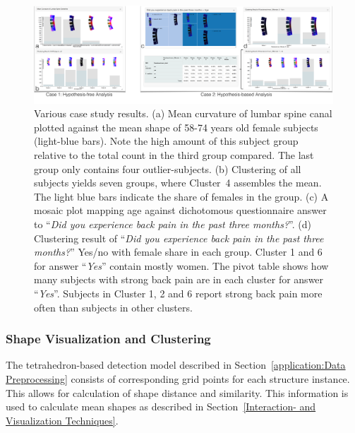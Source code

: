 \documentclass[journal]{style/vgtc} 			          %
\begin{document}
\begin{figure}[htb]
 \centering
 \includegraphics[width=1\textwidth, resolution=300]{figures/evaluation}
 \caption{Various case study results.
 (a) Mean curvature of lumbar spine canal plotted against the mean shape of 58-74 years old female subjects (light-blue bars).
 Note the high amount of this subject group relative to the total count in the third group compared. The last group only contains four outlier-subjects.
 (b) Clustering of all subjects yields seven groups, where Cluster~4 assembles the mean. The light blue bars indicate the share of females in the group.
 (c) A mosaic plot mapping age against dichotomous questionnaire answer to ``\emph{Did you experience back pain in the past three months?}''.
 (d) Clustering result of ``\emph{Did you experience back pain in the past three months?}'' Yes/no with female share in each group. 
 Cluster 1 and 6 for answer ``\emph{Yes}'' contain mostly women.
 The pivot table shows how many subjects with strong back pain are in each cluster for answer ``\emph{Yes}''.
 Subjects in Cluster 1, 2 and 6 report strong back pain more often than subjects in other clusters.
 }
 \label{fig:application}
\end{figure}
\subsubsection{Shape Visualization and Clustering}
%
The tetrahedron-based detection model described in Section~\ref{application:Data Preprocessing} consists of corresponding grid points for each structure instance.
%
This allows for calculation of shape distance and similarity.
%
This information is used to calculate mean shapes as described in Section~\ref{Interaction- and Visualization Techniques}.
\end{document}

